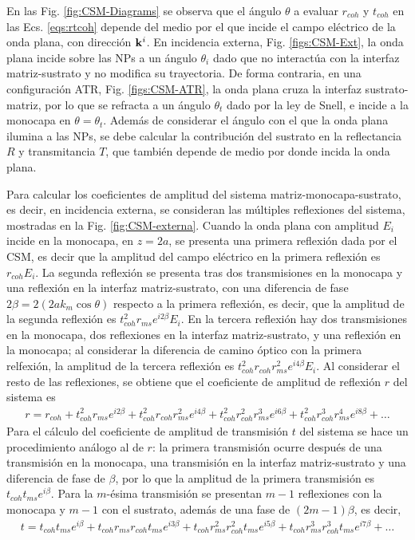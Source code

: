 En las Fig. \ref{fig:CSM-Diagrams}	 se observa que el ángulo $\theta$ a evaluar $r_{coh}$ y $t_{coh}$ en las Ecs. \eqref{eqs:rtcoh} depende del medio por el que incide el campo eléctrico de la onda plana, con dirección $\vb{k}^i$. En incidencia externa, Fig. \ref{figs:CSM-Ext}, la onda plana incide sobre las NPs a un ángulo $\theta_i$ dado que no interactúa con la interfaz matriz-sustrato y no modifica su trayectoria. De forma contraria, en una configuración ATR, Fig. \ref{figs:CSM-ATR}, la onda plana cruza la interfaz sustrato-matriz, por lo que se refracta a un ángulo $\theta_t$ dado por la ley de Snell, e incide a la monocapa en $\theta=\theta_t$. Además de considerar el ángulo con el que la onda plana ilumina a las NPs, se debe calcular la contribución del sustrato en la reflectancia $R$ y transmitancia $T$, que también depende de medio por donde incida la onda plana.

Para calcular los coeficientes de amplitud del sistema matriz-monocapa-sustrato, es decir, en incidencia externa, se consideran las múltiples reflexiones del sistema, mostradas en la Fig. \ref{fig:CSM-externa}. Cuando la onda plana con amplitud $E_i$ incide en la monocapa, en $z=2a$, se presenta una primera reflexión dada por el CSM, es decir que la amplitud del campo eléctrico en la primera reflexión es $r_{coh}E_i$. La segunda reflexión se presenta tras dos transmisiones en la monocapa y una reflexión en la interfaz matriz-sustrato, con una diferencia de fase $2\beta=2(2ak_m\cos\theta)$ respecto a la primera reflexión, es decir, que la amplitud de la segunda reflexión es $t_{coh}^2r_{ms}e^{i2\beta}E_i$. En la tercera reflexión hay dos transmisiones en la monocapa, dos reflexiones en la interfaz matriz-sustrato, y una reflexión en la monocapa; al considerar la diferencia de camino óptico con la primera relfexión, la amplitud de la tercera reflexión es $t_{coh}^2r_{coh}r_{ms}^2e^{i4\beta}E_i$. Al considerar el resto de las reflexiones, se obtiene que el coeficiente de amplitud de reflexión $r$ del sistema es
	\begin{align}
	r = r_{coh} +
		 t_{coh}^2r_{ms}e^{i2\beta}+
		 t_{coh}^2r_{coh}r_{ms}^2e^{i4\beta}+
		 t_{coh}^2r_{coh}^2r_{ms}^3e^{i6\beta}+
		 t_{coh}^2r_{coh}^3r_{ms}^4e^{i8\beta}+\ldots
	\label{eq:r_ext_span}
	\end{align}
Para el cálculo del coeficiente de amplitud de transmisión $t $ del sistema se hace un procedimiento análogo al de $r$: la primera transmisión ocurre después de una transmisión en la monocapa, una transmisión en la interfaz matriz-sustrato y una diferencia de fase de $\beta$, por lo que la amplitud de la primera transmisión es $t_{coh}t_{ms}e^{i\beta}$. Para la $m$-ésima transmisión se presentan $m-1$ reflexiones con la monocapa y $m-1$ con el sustrato, además de una fase de $(2m-1)\beta$, es decir,
	\begin{align}
	t = t_{coh}t_{ms}e^{i\beta} +
		t_{coh}r_{ms}r_{coh}t_{ms}e^{i3\beta}+
		t_{coh}r_{ms}^2r_{coh}^2t_{ms}e^{i5\beta}+	
		t_{coh}r_{ms}^3r_{coh}^3t_{ms}e^{i7\beta}+ \ldots					
	\label{eq:t_ext_span}
	\end{align}

